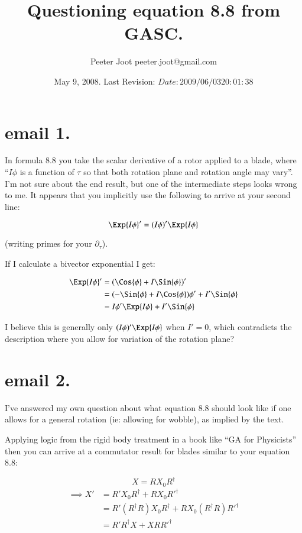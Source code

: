 \documentclass{article}      %
\title{ Questioning equation 8.8 from GASC. } %
\author{Peeter Joot \quad peeter.joot@gmail.com}         %
\date{ May 9, 2008.  Last Revision: $Date: 2009/06/03 20:01:38 $ }
\begin{document}

\maketitle{}

\section{email 1. }

In formula 8.8 you take the scalar derivative of a rotor applied to a blade, where ``$I \phi$ is a function of $\tau$ so that both rotation plane and rotation angle may vary''.  I'm not sure about the end result, but one of the intermediate steps looks wrong to me.  It appears that you implicitly use the following to arrive at your second line:

\[
\Exp{ I \phi }' = ( I \phi )' \Exp{ I \phi }
\]

(writing primes for your $\partial_\tau$).

If I calculate a bivector exponential I get:

\begin{align*}
\Exp{ I \phi }'
&= (\Cos{\phi} + I \Sin{\phi})' \\
&= (-\Sin{\phi} + I \Cos{\phi}) \phi' + I' \Sin{\phi} \\
&= I \phi' \Exp{ I \phi } + I' \Sin{\phi} \\
\end{align*}

I believe this is generally only $(I \phi)' \Exp{ I \phi }$ when $I' = 0$, which contradicts the description where you allow for variation of the rotation plane?

\section{email 2. } 

I've answered my own question about what equation 8.8 should look like if one allows for a general rotation (ie: allowing for wobble), as implied by the text.

Applying logic from the rigid body treatment in a book like ``GA for Physicists'' then you can arrive at a commutator result for blades similar to your equation 8.8:

\[
X = R X_0 R^\dagger
\]
\begin{align*}
\implies
X' &= R' X_0 R^\dagger + R X_0 {R'}^\dagger \\
   &= R' (R^\dagger R) X_0 R^\dagger + R X_0 (R^\dagger R) {R'}^\dagger \\
   &= R' R^\dagger X + X R {R'}^\dagger \\
\end{align*}
\end{document}
